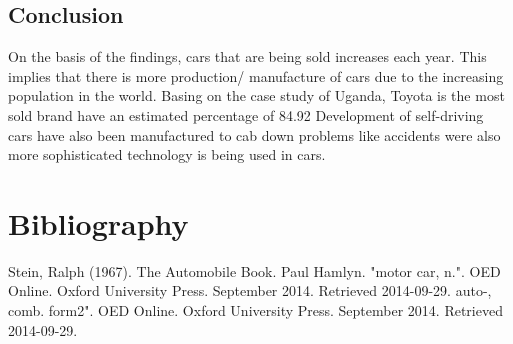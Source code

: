 \documentclass[12]{article}
\begin{document}
\subsection{Conclusion}
On the basis of the findings, cars that are being sold increases each year. This implies that there is more production/ manufacture of cars due to the increasing population in the world. Basing on the case study of Uganda, Toyota is the most sold brand have an estimated percentage of 84.92%
Development of self-driving cars have also been manufactured to cab down problems like accidents were also more sophisticated technology is being used in cars.

\section{Bibliography}
Stein, Ralph (1967). The Automobile Book. Paul Hamlyn.
"motor car, n.". OED Online. Oxford University Press. September 2014. Retrieved 2014-09-29.
 auto-, comb. form2". OED Online. Oxford University Press. September 2014. Retrieved 2014-09-29.
\end{document}
